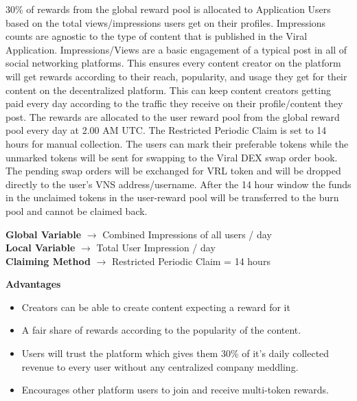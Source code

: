 \documentclass[conference]{IEEEtran}
\begin{document}
30\% of rewards from the global reward pool is allocated to Application Users based on the total views/impressions users get on their profiles. Impressions counts are agnostic to the type of content that is published in the Viral Application. Impressions/Views are a basic engagement of a typical post in all of social networking platforms. This ensures every content creator on the platform will get rewards according to their reach, popularity, and usage they get for their content on the decentralized platform. This can keep content creators getting paid every day according to the traffic they receive on their profile/content they post. The rewards are allocated to the user reward pool from the global reward pool every day at 2.00 AM UTC. The Restricted Periodic Claim is set to 14 hours for manual collection. The users can mark their preferable tokens while the unmarked tokens will be sent for swapping to the Viral DEX swap order book. The pending swap orders will be exchanged for VRL token and will be dropped directly to the user's VNS address/username. After the 14 hour window the funds in the unclaimed tokens in the user-reward pool will be transferred to the burn pool and cannot be claimed back.\\

\begin{center}
\textbf{Global Variable} $\to$ Combined Impressions of all users / day\\
\vspace{2mm}
\textbf{Local Variable} $\to$ Total User Impression / day\\
\vspace{2mm}
\textbf{Claiming Method} $\to$ Restricted Periodic Claim = 14 hours\\
\end{center}

\textbf{Advantages}
\begin{itemize}[wide, labelwidth=!, labelindent=0pt]
\item Creators can be able to create content expecting a reward for it
\item A fair share of rewards according to the popularity of the content.
\item Users will trust the platform which gives them 30\% of it’s daily collected revenue to every user without any centralized company meddling.
\item Encourages other platform users to join and receive multi-token rewards.
\end{itemize}
\end{document}
